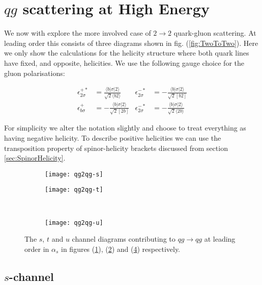 	\section{$qg$ scattering at High Energy}

		We now with explore the more involved case of $2\rightarrow 2$ quark-gluon scattering.  At leading order this
		consists of three diagrams shown in fig. (\ref{fig:TwoToTwo}).  Here we only show the calculations
		for the helicity structure where both quark lines have fixed, and opposite, helicities.  We use
		the following gauge choice for the gluon polarisations:

		\begin{align}
		\epsilon^{+*}_{2\sigma}&=\frac{\langle b|\sigma|2\rangle}{\sqrt{2}\langle b2\rangle} & \epsilon^{-*}_{2\sigma} &= -\frac{\langle b|\sigma|2\rangle}{\sqrt{2}[b2]} \\
		\epsilon^{+}_{b\sigma}&=-\frac{\langle b|\sigma|2\rangle}{\sqrt{2}[2b]} & \epsilon^{-*}_{2\sigma} &= -\frac{\langle b|\sigma|2\rangle}{\sqrt{2}\langle 2b\rangle}
		\end{align}

		For simplicity we alter the notation slightly and choose to treat everything as having negative helicity.
		To describe positive helicities we can use the transposition property of spinor-helicity brackets discussed
		from section \ref{sec:SpinorHelicity}.

		\begin{figure}[h]
			\centering
			\begin{subfigure}[b]{0.3\textwidth}
				\texttt{[image: qg2qg-s]}
				\caption{}
				\label{fig:qg2qg-s}
			\end{subfigure}

			\begin{subfigure}[b]{0.3\textwidth}
				\texttt{[image: qg2qg-t]}
				\caption{}
				\label{fig:qg2qg-t}
			\end{subfigure}
			~
			\begin{subfigure}[b]{0.3\textwidth}
				\texttt{[image: qg2qg-u]}
				\caption{}
				\label{fig:qg2qg-u}
			\end{subfigure}
			\caption{The $s$, $t$ and $u$ channel diagrams contributing to $qg\rightarrow qg$ at leading
			         order in $\alpha_s$ in figures (\ref{fig:qg2qg-s}), (\ref{fig:qg2qg-t}) and (\ref{fig:qg2qg-u})
			         respectively.}
		\end{figure}

		\subsection{$s$-channel}

